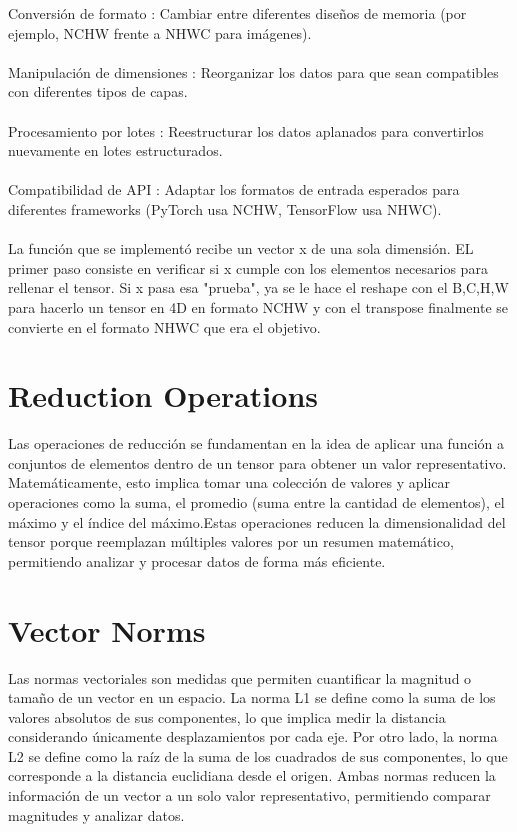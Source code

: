 \documentclass[12pt, letterpaper]{article}
\begin{document}
\noindent Conversión de formato : Cambiar entre diferentes diseños de memoria (por ejemplo, NCHW frente a NHWC para imágenes). \\ \\ 
Manipulación de dimensiones : Reorganizar los datos para que sean compatibles con diferentes tipos de capas. \\ \\ 
Procesamiento por lotes : Reestructurar los datos aplanados para convertirlos nuevamente en lotes estructurados. \\ \\ 
Compatibilidad de API : Adaptar los formatos de entrada esperados para diferentes frameworks (PyTorch usa NCHW, TensorFlow usa NHWC). \\ \\  

La función que se implementó recibe un vector x de una sola dimensión. EL primer paso consiste en verificar si x cumple con los elementos necesarios para rellenar
el tensor. Si x pasa esa "prueba", ya se le hace el reshape con el B,C,H,W para hacerlo un tensor en 4D en formato NCHW y con el transpose finalmente se convierte en el formato NHWC
que era el objetivo. 

\newpage

\section{Reduction Operations}

Las operaciones de reducción se fundamentan en la idea de aplicar una función a conjuntos de elementos dentro de un tensor para obtener un valor representativo. 
Matemáticamente, esto implica tomar una colección de valores y aplicar operaciones como la suma, el promedio (suma entre 
la cantidad de elementos), el máximo y el índice del máximo.Estas operaciones reducen la dimensionalidad del tensor porque reemplazan múltiples valores por un resumen matemático,
permitiendo analizar y procesar datos de forma más eficiente.

\newpage

\section{Vector Norms}

Las normas vectoriales son medidas que permiten cuantificar la magnitud o tamaño de un vector en un espacio. La norma L1 se define 
como la suma de los valores absolutos de sus componentes, lo que implica medir la distancia considerando únicamente desplazamientos 
por cada eje. Por otro lado, la norma L2 se define como la raíz de la suma de los cuadrados de sus componentes, lo que corresponde a 
la distancia euclidiana desde el origen. Ambas normas reducen la información de un vector a un solo valor representativo, permitiendo 
comparar magnitudes y analizar datos.
\end{document}
